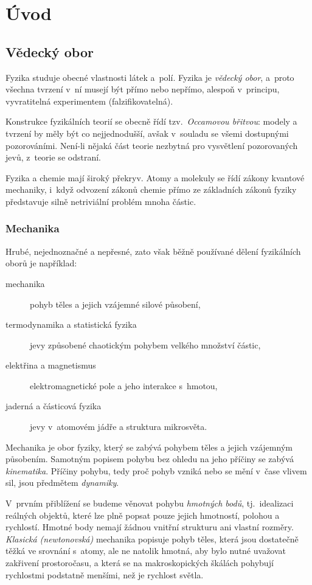 \chapter*{Úvod}

\section*{Vědecký obor}

Fyzika studuje obecné vlastnosti látek a~polí. Fyzika je \emph{vědecký obor}, a~proto všechna tvrzení v~ní musejí být přímo nebo nepřímo, alespoň v~principu, vyvratitelná experimentem (falzifikovatelná).

Konstrukce fyzikálních teorií se obecně řídí tzv.~\emph{Occamovou břitvou}: modely a tvrzení by měly být co nejjednodušší, avšak v~souladu se všemi dostupnými pozorováními. Není-li nějaká část teorie nezbytná pro vysvětlení pozorovaných jevů, z~teorie se odstraní.

Fyzika a chemie mají široký překryv. Atomy a molekuly se řídí zákony kvantové mechaniky, i~když odvození zákonů chemie přímo ze základních zákonů fyziky představuje silně netriviální problém mnoha částic.

\subsection*{Mechanika}

Hrubé, nejednoznačné a nepřesné, zato však běžně používané dělení fyzikálních oborů je například:
\begin{description}
    \item[mechanika] pohyb těles a jejich vzájemné silové působení,
    \item[termodynamika a statistická fyzika] jevy způsobené chaotickým pohybem velkého množství částic,
    \item[elektřina a magnetismus] elektromagnetické pole a jeho interakce s~hmotou,
    \item[jaderná a částicová fyzika] jevy v~atomovém jádře a struktura mikrosvěta.
\end{description}

Mechanika je obor fyziky, který se zabývá pohybem těles a jejich vzájemným působením. Samotným popisem pohybu bez ohledu na jeho příčiny se zabývá \emph{kinematika}. Příčiny pohybu, tedy proč pohyb vzniká nebo se mění v~čase vlivem sil, jsou předmětem \emph{dynamiky}.

V~prvním přiblížení se budeme věnovat pohybu \emph{hmotných bodů}, tj.~idealizaci reálných objektů, které lze plně popsat pouze jejich hmotností, polohou a rychlostí. Hmotné body nemají žádnou vnitřní strukturu ani vlastní rozměry. \emph{Klasická (newtonovská)} mechanika popisuje pohyb těles, která jsou dostatečně těžká ve srovnání s~atomy, ale ne natolik hmotná, aby bylo nutné uvažovat zakřivení prostoročasu, a která se na makroskopických škálách pohybují rychlostmi podstatně menšími, než je rychlost světla.


